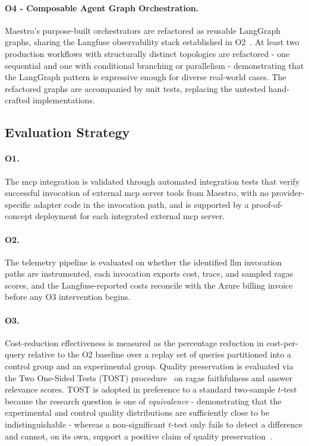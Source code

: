 \paragraph{O4 - Composable Agent Graph Orchestration.}
Maestro's purpose-built orchestrators are refactored as reusable LangGraph
graphs, sharing the Langfuse observability stack established in
O2~\cite{chase2022langchain}.
At least two production workflows with structurally distinct topologies are
refactored - one sequential and one with conditional branching or parallelism -
demonstrating that the LangGraph pattern is expressive enough for diverse
real-world cases.
The refactored graphs are accompanied by unit tests, replacing the untested
hand-crafted implementations.

\subsection{Evaluation Strategy}
\label{subsec:evaluation}

\paragraph{O1.}
The \gls{mcp} integration is validated through automated integration tests that
verify successful invocation of external \gls{mcp} server tools from Maestro, with no
provider-specific adapter code in the invocation path, and is supported by a
proof-of-concept deployment for each integrated external \gls{mcp} server.

\paragraph{O2.}
The telemetry pipeline is evaluated on whether the identified \gls{llm} invocation
paths are instrumented, each invocation exports cost, trace, and sampled \gls{ragas}
scores, and the Langfuse-reported costs reconcile with the Azure billing invoice
before any O3 intervention begins.

\paragraph{O3.}
Cost-reduction effectiveness is measured as the percentage reduction in
cost-per-query relative to the O2 baseline over a replay set of queries
partitioned into a control group and an experimental group.
Quality preservation is evaluated via the Two One-Sided Tests (TOST)
procedure~\cite{lakens_2017_tost} on \gls{ragas} faithfulness and answer relevance
scores.
TOST is adopted in preference to a standard two-sample $t$-test because the
research question is one of \textit{equivalence} - demonstrating that the
experimental and control quality distributions are sufficiently close to be
indistinguishable - whereas a non-significant $t$-test only fails to detect a
difference and cannot, on its own, support a positive claim of quality
preservation~\cite{lakens_scheel_isager_2018}.

